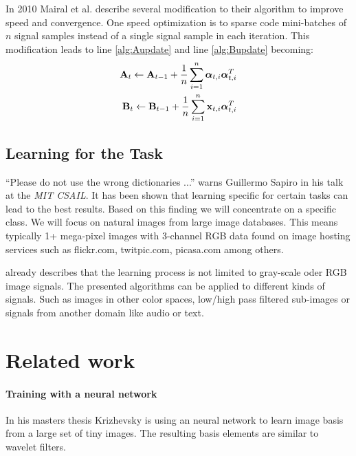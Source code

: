 In 2010 Mairal et al. \cite{Mairal2010} describe several modification to
their algorithm to improve speed and convergence. One speed optimization is to
sparse code mini-batches of $n$ signal samples instead of a single signal sample
in each iteration. This modification leads to line \ref{alg:Aupdate} and line
\ref{alg:Bupdate}
becoming:
\begin{align*}
\boldsymbol{\mathrm{A}}_t \gets \boldsymbol{\mathrm{A}}_{t-1} +
\frac{1}{n}\sum_{i=1}^{n}\boldsymbol{\mathrm{\alpha}}_{t,i}\boldsymbol{\mathrm{\alpha}}_{t,i}^T\\
\boldsymbol{\mathrm{B}}_t \gets \boldsymbol{\mathrm{B}}_{t-1} +
\frac{1}{n}\sum_{i=1}^{n}\boldsymbol{\mathrm{x}}_{t,i}\boldsymbol{\mathrm{\alpha}}_{t,i}^T
\end{align*}

\subsection{Learning for the Task}
\label{sec:learnForTheTask}
``Please do not use the wrong dictionaries ...''
warns Guillermo Sapiro in his talk at the \emph{MIT CSAIL}.
It has been shown that learning specific for certain tasks can lead to the
best results. Based on this finding we will concentrate on a
specific class. We will focus on natural images from large image databases.
This means typically 1+ mega-pixel images with 3-channel RGB data found on image
hosting services such as flickr.com, twitpic.com, picasa.com among others.

 already describes that the learning
process is not limited to gray-scale oder RGB image signals. The presented
algorithms can be applied to different kinds of signals. Such as images in
other color spaces, low/high pass filtered sub-images or signals from another
domain like audio or text. 


\section{Related work}
\label{sec:related_dictionarie}


\paragraph{Training with a neural network} In his masters thesis 
Krizhevsky \cite{Krizhevsky2009} is using an neural network to learn image basis
from a large set of tiny images. The resulting basis elements are similar to
wavelet filters.

